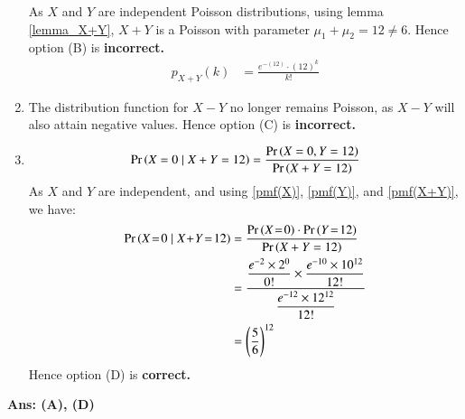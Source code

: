 \documentclass[journal,12pt,twocolumn]{IEEEtran}
\begin{document}
\begin{enumerate}[label=\textbf{(\Alph*)}]
    \par As $X$ and $Y$ are independent Poisson distributions, using lemma \eqref{lemma_X+Y}, $X+ Y$ is a Poisson with parameter $\mu_1 + \mu_2 = 12 \neq 6$. Hence option (B) is \textbf{incorrect.}
    \begin{align}
         p_{X+Y}(k) &= \frac{e^{-(12)} \cdot (12)^k}{k!}\label{pmf(X+Y)}
    \end{align}
    \item The distribution function for $X - Y$ no longer remains Poisson, as $X - Y$ will also attain negative values.
    Hence option (C) is \textbf{incorrect.}

    \item \begin{align}
        \Pr\left(X=0\mid X+Y=12\right) = \dfrac{\Pr\left(X=0, Y=12\right)}{\Pr\left(X+Y=12\right)}
    \end{align}
    As $X$ and $Y$ are independent, and using \eqref{pmf(X)}, \eqref{pmf(Y)}, and \eqref{pmf(X+Y)}, we have:
    \begin{align}
        \pr{X\!=\!0\mid X\!+\!Y\!=\!12} &= \frac{\pr{X\!=\!0} \cdot \pr{Y\!=\!12}}{\pr{X+Y=12}} \\
        &= \frac{\dfrac{e^{-2}\times 2^{0}}{0!} \times \dfrac{e^{-10}\times10^{12}}{12!}}{\dfrac{e^{-12}\times12^{12}}{12!}}\\
        &= \left(\dfrac{5}{6}\right)^{12}
    \end{align}
    Hence option (D) is \textbf{correct.}
\end{enumerate}
\textbf{Ans: (A), (D)}
\end{document}
